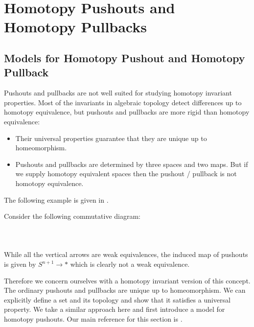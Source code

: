 \section{Homotopy Pushouts and Homotopy Pullbacks}
\subsection{Models for Homotopy Pushout and Homotopy Pullback}
Pushouts and pullbacks are not well suited for studying homotopy invariant properties. Most of the invariants in algebraic topology detect differences up to homotopy equivalence, but pushouts and pullbacks are more rigid than homotopy equivalence: 

\begin{itemize}
\item Their universal properties guarantee that they are unique up to homeomorphism. 
\item Pushouts and pullbacks are determined by three spaces and two maps. But if we supply homotopy equivalent spaces then the pushout / pullback is not homotopy equivalence. 
\end{itemize}

The following example is given in \cite{PHC}. 

\begin{eg}\label{Ex1} Consider the following commutative diagram:   
 \\~\\  \\~\\
While all the vertical arrows are weak equivalences, the induced map of pushouts is given by $S^{n+1}\to\ast$ which is clearly not a weak equivalence. 
\end{eg}

Therefore we concern ourselves with a homotopy invariant version of this concept. The ordinary pushouts and pullbacks are unique up to homeomorphism. We can explicitly define a set and its topology and show that it satisfies a universal property. We take a similar approach here and first introduce a model for homotopy pushouts. Our main reference for this section is \cite{CHT}. 

